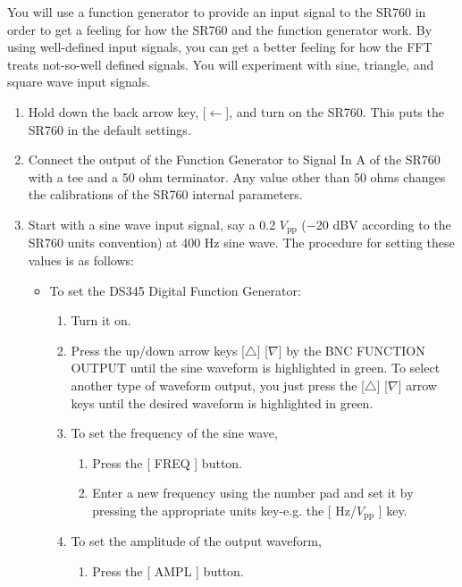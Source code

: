 \documentclass{../lab}
\begin{document}
You will use a function generator to provide an input signal to the SR760 in order to get a feeling for how the SR760 and the function generator work. By using well-defined input signals, you can get a better feeling for how the FFT treats not-so-well defined signals. You will experiment with sine, triangle, and square wave input signals.

\begin{enumerate}
    \item Hold down the back arrow key, [$\leftarrow$], and turn on the SR760. This puts the SR760 in the default settings.

    \item Connect the output of the Function Generator to Signal In A of the SR760 with a tee and a 50 ohm terminator. Any value other than 50 ohms changes the calibrations of the SR760 internal parameters.

    \item Start with a sine wave input signal, say a 0.2 $V_\text{pp}$ ($-$20 dBV according to the SR760 units convention) at 400 Hz sine wave. The procedure for setting these values is as follows:
    \begin{itemize}
        \item To set the DS345 Digital Function Generator:
        \begin{enumerate}
            \item Turn it on.

            \item Press the up/down arrow keys [$\triangle$] [$\nabla$] by the BNC FUNCTION OUTPUT until the sine waveform is highlighted in green. To select another type of waveform output, you just press the [$\triangle$] [$\nabla$] arrow keys until the desired waveform is highlighted in green.

            \item To set the frequency of the sine wave,
            \begin{enumerate}
                \item Press the [ FREQ ] button.

                \item Enter a new frequency using the number pad and set it by pressing the appropriate units key-e.g. the [ Hz/$V_\text{pp}$ ] key.

            \end{enumerate}

            \item To set the amplitude of the output waveform,
            \begin{enumerate}
                \item Press the [ AMPL ] button.


\end{enumerate}
\end{enumerate}
\end{itemize}
\end{enumerate}
\end{document}
